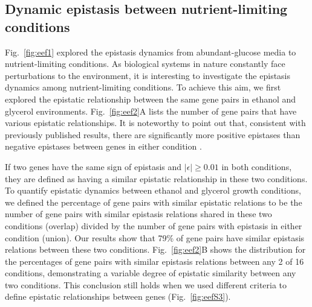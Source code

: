\documentclass[10pt]{article}
\newcommand{\Fig}{Fig.}
\newcommand{\citep}{\cite}
\begin{document}
\subsection*{Dynamic epistasis between nutrient-limiting conditions}

\Fig~\ref{fig:eef1} explored the epistasis dynamics from abundant-glucose media
to nutrient-limiting conditions. As biological systems in nature
constantly face perturbations to the environment, it is
interesting to investigate the epistasis dynamics among
nutrient-limiting conditions. To achieve this aim, we first explored
the epistatic relationship between the same gene pairs in ethanol and
glycerol environments. \Fig~\ref{fig:eef2}A lists the number of gene pairs that have various
epistatic relationships. It is noteworthy to point out that,
consistent with previously published results, there are significantly
more positive epistases than negative epistases between genes in either
condition \citep{He2010}.


If two genes have the same sign of epistasis and
$\left|\epsilon\right| \geq 0.01$ in both conditions, they are defined
as having a similar epistatic
relationship in these two conditions. To quantify epistatic dynamics
between ethanol and glycerol growth conditions, we defined the
percentage of gene pairs with similar epistatic relations to be the
number of gene pairs with similar epistasis relations shared in these
two conditions (overlap) divided by the number of gene pairs with
epistasis in either condition (union). Our results show that 79\% of
gene pairs have similar epistasis relations between these two
conditions. \Fig~\ref{fig:eef2}B shows the distribution for the percentages of
gene pairs with similar epistasis relations between any 2 of 16
conditions, demonstrating a variable degree of epistatic similarity
between any two conditions.  This conclusion still holds when we used
different criteria to define epistatic relationships between genes
(\Fig~\ref{fig:eefS3}).
\end{document}
